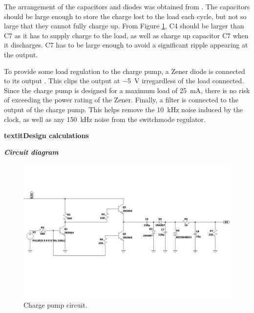 The arrangement of the capacitors and diodes was obtained from \cite{chargepump-main}. The capacitors should be large enough to store the charge lost to the load each cycle, but not so large that they cannot fully charge up. From Figure \ref{fig:chargepump_circuit}, C4 should be larger than C7 as it has to supply charge to the load, as well as charge up capacitor C7 when it discharges. C7 has to be large enough to avoid a significant ripple appearing at the output. 

To provide some load regulation to the charge pump, a Zener diode is connected to its output \cite{Neamen:Microelectronics}. This clips the output at \SI{-5}{\volt} irregardless of the load connected. Since the charge pump is designed for a maximum load of \SI{25}{\milli\ampere}, there is no risk of exceeding the power rating of the Zener. Finally, a filter is connected to the output of the charge pump. This helps remove the \SI{10}{\kilo Hz} noise induced by the clock, as well as any \SI{150}{\kilo Hz} noise from the switchmode regulator.


\noindent\textbf{textit{Design calculations}}


\noindent\textbf{\textit{Circuit diagram}}
 
\begin{figure}[h] 
 \centering
  	\includegraphics[clip, trim = 0cm 4.2cm 0cm 2.8cm, width=1\linewidth]{./Figures/chargepump_circuit.pdf}
  	\caption{Charge pump circuit.}
  	\label{fig:chargepump_circuit}
 \end{figure}
 
 

